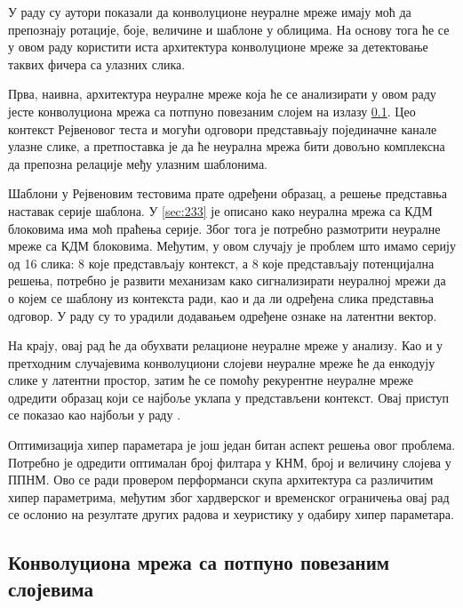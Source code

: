 \documentclass[a4paper, 12pt, master, utf8]{etf}
\begin{document}
У раду \cite{hoshen_iq_2017} су аутори показали да конволуционе неуралне мреже имају моћ да препознају ротације, боје, величине и шаблоне 
у облицима. На основу тога ће се у овом раду користити иста архитектура конволуционе мреже за детектовање таквих фичера са улазних слика.
\newline

Прва, наивна, архитектура неуралне мреже која ће се анализирати у овом раду јесте конволуциона мрежа са потпуно повезаним слојем на излазу \ref{sec:411}. Цео контекст Рејвеновог теста и могући одговори представњају појединачне канале улазне слике, 
а претпоставка је да ће неурална мрежа бити довољно комплексна да препозна релације међу улазним шаблонима.
\newline

Шаблони у Рејвеновим тестовима прате одређени образац, а решење представња наставак серије шаблона. У \ref{sec:233} је описано како неурална мрежа са КДМ блоковима има моћ праћења серије. Због тога је потребно размотрити неуралне мреже са КДМ блоковима.
Међутим, у овом случају је проблем што имамо серију од 16 слика: 8 које представљају контекст, а 8 које представљају потенцијална решења, потребно је развити механизам како сигнализирати неуралној мрежи да о којем се шаблону из контекста ради, као и да ли одређена слика представња одговор.
У раду \cite{barrett_measuring_2018} су то урадили додавањем одређене ознаке на латентни вектор.
\newline

На крају, овај рад ће да обухвати релационе неуралне мреже у анализу. Као и у претходним случајевима конволуциони слојеви неуралне мреже ће да 
енкодују слике у латентни простор, затим ће се помоћу рекурентне неуралне мреже одредити образац који се најбоље уклапа у представљени контекст. Овај приступ се показао као најбољи у раду \cite{barrett_measuring_2018}.
\newline

Оптимизација хипер параметара је још један битан аспект решења овог проблема. Потребно је одредити оптималан број филтара у КНМ, број и величину слојева у ППНМ. 
Ово се ради провером перформанси скупа архитектура са различитим хипер параметрима, међутим због хардверског и временског ограничења овај рад се ослонио на
резултате других радова и хеуристику у одабиру хипер параметара.

\subsection{Конволуциона мрежа са потпуно повезаним слојевима}
\label{sec:411}
\end{document}
